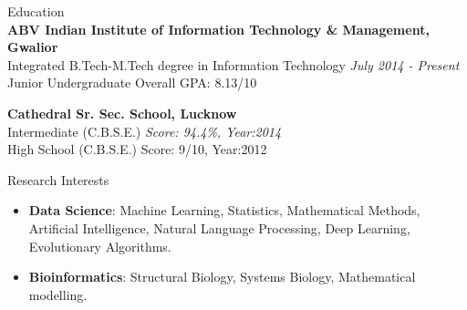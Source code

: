 \documentclass{resume} %
\begin{document}

\begin{rSection}{Education}
\quad \\
{\bf ABV Indian Institute of Information Technology \& Management, Gwalior} %
\\ Integrated B.Tech-M.Tech degree in Information Technology  \hfill {\em July 2014 - Present} 
\\Junior Undergraduate  \hfill { Overall GPA: 8.13/10}

{\bf Cathedral Sr. Sec. School, Lucknow} %
\\ Intermediate (C.B.S.E.)    \hfill {\em Score: 94.4\%, Year:2014} 
\\High School (C.B.S.E.)  \hfill {Score: 9/10, Year:2012}


\end{rSection}

\begin{rSection}{Research Interests}

\begin{itemize}
\item \textbf{Data Science}: Machine Learning, Statistics, Mathematical Methods, Artificial Intelligence, Natural Language Processing, Deep Learning, Evolutionary Algorithms. 
\item \textbf{Bioinformatics}: Structural Biology, Systems Biology, Mathematical modelling.
\end{itemize}
\end{rSection}


\end{document}
